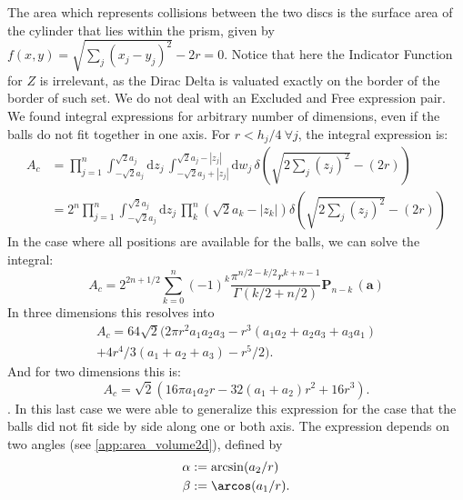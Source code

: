 \documentclass[superscriptaddress,pre,reprint,showpacs,twocolumn]{revtex4-1}
\newcommand{\rd}[1]{\mathrm{d}{#1} \,}
\newcommand{\sumprod}[1]{\mathbf{P}_{#1} \,}
\begin{document}
The area which represents collisions between the two discs is the surface area of the cylinder
that lies within the prism, given by
$f(x,y) = \sqrt{\sum_j (x_j-y_j)^2} -2r=0$.
Notice that here the Indicator Function for $Z$ is irrelevant, as
the Dirac Delta is valuated exactly on the border of the border
of such set. We do not deal with an Excluded and Free expression pair.
 We found integral expressions for
arbitrary number of dimensions, even if the balls do not fit
together in one axis.
For $r<h_j/4 \: \forall j$, the integral expression is:
\begin{equation}
  \begin{split}
  A_{c} & =  \prod_{j=1}^n\int_{-\sqrt{2}a_j}^{\sqrt{2}a_j} \rd{z_j}
  \int_{-\sqrt{2}a_j+|z_j|}^{\sqrt{2}a_j-|z_j|} \rd{w_j}
  \delta (\sqrt{2 \sum_j (z_j)^2} - (2r)) \\
  & = 2^n \prod_{j=1}^n\int_{-\sqrt{2}a_j}^{\sqrt{2}a_j} \rd{z_j}
  \prod_k^n(\sqrt{2} a_k -|z_k|)
  \delta (\sqrt{2 \sum_j (z_j)^2} - (2r))
  \end{split}
\end{equation}
In the case where all positions are available for the balls, we can solve
the integral:
\begin{equation}
  A_{c}=  2^{2n+1/2} \sum_{k=0}^{n} (-1)^k
  \frac{\pi^{n/2-k/2} r^{k+n-1}}{\Gamma(k/2+n/2)}
  \sumprod{n-k}(\mathbf{a}) 
\end{equation}
In three dimensions
this resolves into
\begin{equation}\label{col3dnormal}
   \begin{split}
     A_{c}=64 \sqrt{2} \big(2 \pi r^2 a_1a_2a_3 
      - r^3 (a_1a_2 +a_2a_3 + a_3 a_1) \\
  +4r^4/3 (a_1+a_2+a_3)
  -r^5/2 \big).
  \end{split}
\end{equation}
And for two dimensions this is:
\begin{equation}\label{AreaChoque}
A_{c}  =  \sqrt{2} (
16\pi a_1 a_2 r -32 (a_1+a_2)r^2 +16 r^3).
\end{equation}.
In this last case we were able to generalize this expression for
the case that the balls did not fit side by side along one or both
axis. The  expression depends on two angles
(see \ref{app:area_volume2d}), defined by
\begin{equation}\label{angulos2d}
 \begin{aligned}
\alpha & :=\arcsin(a_2/r) \\
\beta & := \arcos(a_1/r) .\\
  \end{aligned}
\end{equation}
\end{document}
